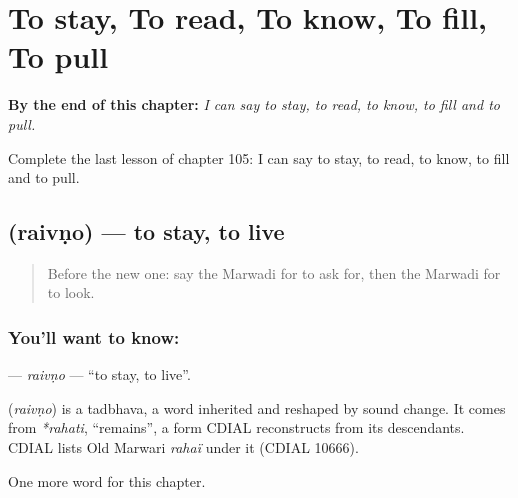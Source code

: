 
\chapter{To stay, To read, To know, To fill, To pull}
\label{ch:mw-to-stay-to-read-to-know-to-fill-to-pull}

\begin{chapteropening}
\textbf{By the end of this chapter:} \emph{I can say to stay, to read, to know, to fill and to pull.}

Complete the last lesson of chapter 105: I can say to stay, to read, to know, to fill and to pull.
\end{chapteropening}

\section[\texorpdfstring{\mw{रैवणो} (raivṇo)}{रैवणो (raivṇo)}]{ (raivṇo) — to stay, to live}

\label{lesson:MW-C105-raivno}



\begin{quote}
Before the new one: say the Marwadi for to ask for, then the Marwadi for to look.
\end{quote}

\subsection*{You'll want to know: }
\textbf{} — \emph{raivṇo} — \textquotedblleft{}to stay, to live\textquotedblright{}.

\begin{cousinweb}
\textbf{} (\emph{raivṇo}) is a tadbhava, a word inherited and reshaped by sound change. It comes from \emph{*rahati}, \textquotedblleft{}remains\textquotedblright{}, a form CDIAL reconstructs from its descendants. CDIAL lists Old Marwari \emph{rahaï} under it (CDIAL 10666).
\end{cousinweb}

\begin{grammarlens}[title={What you've built}]
One more word for this chapter.
\end{grammarlens}

